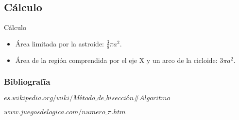 \documentclass{beamer}
\begin{document}
\subsection{Cálculo} 
\begin{frame}

\begin{block}{Cálculo}
\begin{itemize}
  \item Área limitada por la astroide: $\frac{3}{8}\pi a^2 $.
  \pause

  \item Área de la región comprendida por el eje X y un arco de la cicloide: $3 \pi a^2.$

\end{itemize}
\end{block}

\end{frame}

\begin{frame}
\frametitle{Bibliografía}
\begin{thebibliography}
  \beamertermplatebookbibitems
  {\small $es.wikipedia.org/wiki/Método\_de\_bisección\#Algoritmo$}
  
  \beamertermplatebookbibitems
  {\small $www.juegosdelogica.com/numero\_\pi.htm$}
  
\end{thebibliography}
\end{frame}
\end{document}
